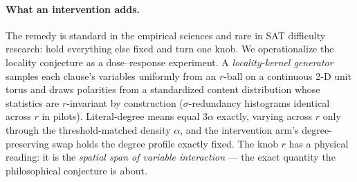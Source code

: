 \documentclass[11pt]{article}
\begin{document}
\paragraph{What an intervention adds.}
The remedy is standard in the empirical sciences and rare in SAT difficulty
research: hold everything else fixed and turn one knob. We operationalize the
locality conjecture as a dose--response experiment. A \emph{locality-kernel
generator} samples each clause's variables uniformly from an $r$-ball on a
continuous 2-D unit torus and draws polarities from a standardized content
distribution whose statistics are $r$-invariant by construction
($\sigma$-redundancy histograms identical across $r$ in pilots). Literal-degree
means equal $3\alpha$ exactly, varying across $r$ only through the
threshold-matched density $\alpha$, and the intervention arm's
degree-preserving swap holds the degree profile exactly fixed. The knob $r$ has a physical
reading: it is the \emph{spatial span of variable interaction} --- the exact
quantity the philosophical conjecture is about.
\end{document}
